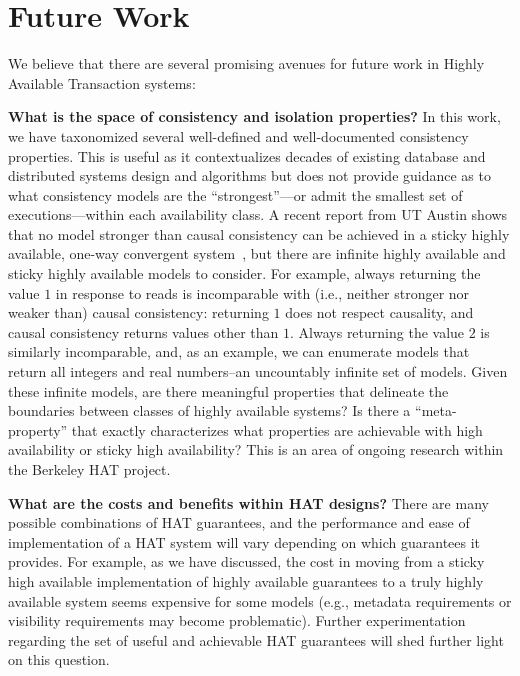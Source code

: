 
\section{Future Work}
\label{sec:futurework}

We believe that there are several promising avenues for future work in
Highly Available Transaction systems:

\textbf{What is the space of consistency and isolation properties?} In
this work, we have taxonomized several well-defined and
well-documented consistency properties. This is useful as it
contextualizes decades of existing database and distributed systems
design and algorithms but does not provide guidance as to what
consistency models are the ``strongest''---or admit the smallest set
of executions---within each availability class. A recent report from
UT Austin shows that no model stronger than causal consistency can be
achieved in a sticky highly available, one-way convergent
system~\cite{cac}, but there are infinite highly available and sticky
highly available models to consider. For example, always returning the
value $1$ in response to reads is incomparable with (i.e., neither
stronger nor weaker than) causal consistency: returning $1$ does not
respect causality, and causal consistency returns values other than
$1$. Always returning the value $2$ is similarly incomparable, and, as
an example, we can enumerate models that return all integers and real
numbers--an uncountably infinite set of models. Given these infinite
models, are there meaningful properties that delineate the boundaries
between classes of highly available systems? Is there a
``meta-property'' that exactly characterizes what properties are
achievable with high availability or sticky high availability? This is
an area of ongoing research within the Berkeley HAT project.

\textbf{What are the costs and benefits within HAT designs?} There are
many possible combinations of HAT guarantees, and the performance and
ease of implementation of a HAT system will vary depending on which
guarantees it provides. For example, as we have discussed, the cost in
moving from a sticky high available implementation of highly available
guarantees to a truly highly available system seems expensive for some
models (e.g., metadata requirements or visibility requirements may
become problematic). Further experimentation regarding the set of
useful and achievable HAT guarantees will shed further light on this
question.

